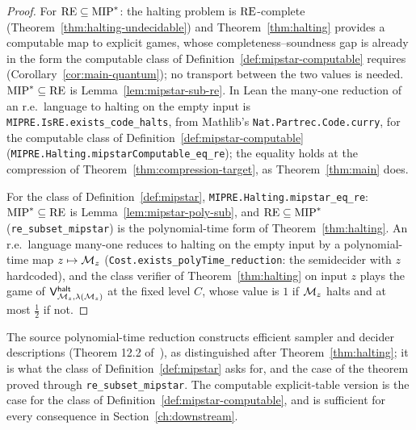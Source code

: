 \begin{proof}
\leanok
For $\mathrm{RE} \subseteq \mathrm{MIP}^*$: the halting problem is $\mathrm{RE}$-complete
(Theorem~\ref{thm:halting-undecidable}) and Theorem~\ref{thm:halting} provides a
computable map to explicit games, whose completeness--soundness gap is already in the
form the computable class of Definition~\ref{def:mipstar-computable} requires
(Corollary~\ref{cor:main-quantum}); no transport between the two values is needed.
$\mathrm{MIP}^* \subseteq \mathrm{RE}$ is
Lemma~\ref{lem:mipstar-sub-re}. In Lean the many-one reduction of an r.e.\ language to
halting on the empty input is \texttt{MIPRE.IsRE.exists\_code\_halts}, from Mathlib's
\texttt{Nat.Partrec.Code.curry}, for the computable class of
Definition~\ref{def:mipstar-computable} (\texttt{MIPRE.Halting.mipstarComputable\_eq\_re});
the equality holds at the compression of Theorem~\ref{thm:compression-target}, as
Theorem~\ref{thm:main} does.

For the class of Definition~\ref{def:mipstar}, \texttt{MIPRE.Halting.mipstar\_eq\_re}:
$\mathrm{MIP}^* \subseteq \mathrm{RE}$ is Lemma~\ref{lem:mipstar-poly-sub}, and $\mathrm{RE} \subseteq \mathrm{MIP}^*$
(\texttt{re\_subset\_mipstar}) is the polynomial-time form of Theorem~\ref{thm:halting}.
An r.e.\ language many-one reduces to halting on the empty input by a polynomial-time map
$z \mapsto \mathcal{M}_z$ (\texttt{Cost.exists\_polyTime\_reduction}: the semidecider with
$z$ hardcoded), and the class verifier of Theorem~\ref{thm:halting} on input $z$ plays the
game of $\mathsf{V}^{\mathsf{halt}}_{\mathcal{M}_z, \lambda(\mathcal{M}_z)}$ at the fixed level $C$, whose value is
$1$ if $\mathcal{M}_z$ halts and at most $\frac12$ if not.
\end{proof}

\begin{remark}
The source polynomial-time reduction constructs efficient sampler and decider
descriptions (Theorem 12.2 of~\cite{JNVWY20}), as distinguished after
Theorem~\ref{thm:halting}; it is what the class of Definition~\ref{def:mipstar} asks for,
and the case of the theorem proved through \texttt{re\_subset\_mipstar}. The computable
explicit-table version is the case for the class of Definition~\ref{def:mipstar-computable},
and is sufficient for every consequence in Section~\ref{ch:downstream}.
\end{remark}
